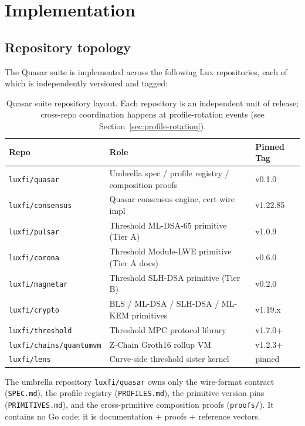 \section{Implementation}
\label{sec:impl}

\subsection{Repository topology}

The Quasar suite is implemented across the following Lux
repositories, each of which is independently versioned and tagged:

\begin{table}[ht]
\centering
\small
\begin{tabular}{@{}lll@{}}
\toprule
\textbf{Repo} & \textbf{Role} & \textbf{Pinned Tag} \\
\midrule
\texttt{luxfi/quasar} & Umbrella spec / profile registry / composition proofs & v0.1.0 \\
\texttt{luxfi/consensus} & Quasar consensus engine, cert wire impl & v1.22.85 \\
\texttt{luxfi/pulsar} & Threshold ML-DSA-65 primitive (Tier A) & v1.0.9 \\
\texttt{luxfi/corona} & Threshold Module-LWE primitive (Tier A docs) & v0.6.0 \\
\texttt{luxfi/magnetar} & Threshold SLH-DSA primitive (Tier B) & v0.2.0 \\
\texttt{luxfi/crypto} & BLS / ML-DSA / SLH-DSA / ML-KEM primitives & v1.19.x \\
\texttt{luxfi/threshold} & Threshold MPC protocol library & v1.7.0+ \\
\texttt{luxfi/chains/quantumvm} & Z-Chain Groth16 rollup VM & v1.2.3+ \\
\texttt{luxfi/lens} & Curve-side threshold sister kernel & pinned \\
\bottomrule
\end{tabular}
\caption{Quasar suite repository layout. Each repository is an
independent unit of release; cross-repo coordination happens at
profile-rotation events (see Section~\ref{sec:profile-rotation}).}
\label{tab:repos}
\end{table}

The umbrella repository \texttt{luxfi/quasar} \cite{quasarrepo} owns
only the wire-format contract (\texttt{SPEC.md}), the profile registry
(\texttt{PROFILES.md}), the primitive version pins
(\texttt{PRIMITIVES.md}), and the cross-primitive composition proofs
(\texttt{proofs/}). It contains no Go code; it is documentation +
proofs + reference vectors.

